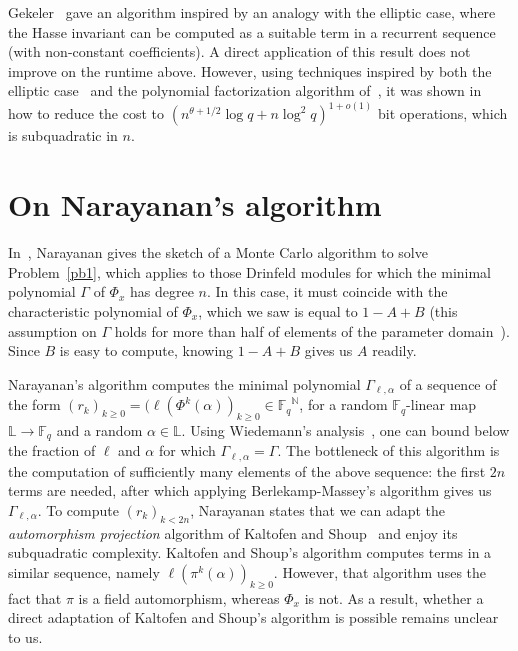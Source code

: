 \documentclass[sigconf]{acmart}
\newcommand{\F}{\mathbb{F}}
\newcommand{\N}{\mathbb{N}}
\renewcommand{\L}{\mathbb{L}}
\begin{document}
Gekeler~\cite[Prop.~3.7]{frobdist} gave an algorithm inspired by an
analogy with the elliptic case, where the Hasse invariant can be
computed as a suitable term in a recurrent sequence (with non-constant
coefficients). A direct application of this result does not improve on
the runtime above. However, using techniques inspired by both the
elliptic case~\cite{BoGaSc07} and the polynomial factorization
algorithm of~\cite{KaSh98}, it was shown
in~\cite{eschost2017arXiv171200669D} how to reduce the cost to
$(n^{\theta+1/2} \log q + n \log^2 q)^{1+o(1)}$ bit operations, which
is subquadratic in $n$.


\section{On Narayanan's algorithm}\label{sec:narayanan}

In~\cite[Sec.~3.1]{Narayanan18}, Narayanan gives the sketch of a
Monte Carlo algorithm to solve Problem~\ref{pb1}, which applies to
those Drinfeld modules for which the minimal polynomial $\Gamma$ of
$\Phi_x$ has degree $n$. In this case, it must coincide with the
characteristic polynomial of $\Phi_x$, which we saw is equal to
$1-A+B$ (this assumption on $\Gamma$ holds for more than half of 
elements of the parameter domain~\cite[Th.~3.6]{Narayanan18}). Since
$B$ is easy to compute, knowing $1-A+B$ gives us $A$ readily.

Narayanan's algorithm computes the minimal polynomial
$\Gamma_{\ell,\alpha}$ of a sequence of the form $(r_k)_{k \ge 0} =
(\ell(\Phi^k(\alpha))_{k\ge 0} \in {\F_q}^\N$, for a random $\F_q$-linear
map $\L\to\F_q$ and a random $\alpha \in \L$. Using Wiedemann's
analysis~\cite{Wiedemann:1986:SSL:13738.13744}, one can bound below
the fraction of $\ell$ and $\alpha$ for which
$\Gamma_{\ell,\alpha}=\Gamma$.
The bottleneck of this algorithm is the computation of sufficiently
many elements of the above sequence: the first $2n$ terms are needed,
after which applying Berlekamp-Massey's algorithm gives us
$\Gamma_{\ell,\alpha}$. To compute $(r_k)_{k < 2n}$, Narayanan states
that we can adapt the {\em automorphism projection} algorithm of
Kaltofen and Shoup~\cite{KaSh98} and enjoy its subquadratic
complexity. Kaltofen and Shoup's algorithm computes terms in a similar
sequence, namely $\ell(\pi^k(\alpha))_{k\ge 0}$. However, that
algorithm uses the fact that $\pi$ is a field automorphism, whereas
$\Phi_x$ is not. As a result, whether a direct adaptation of Kaltofen
and Shoup's algorithm is possible remains unclear to us.
\end{document}
